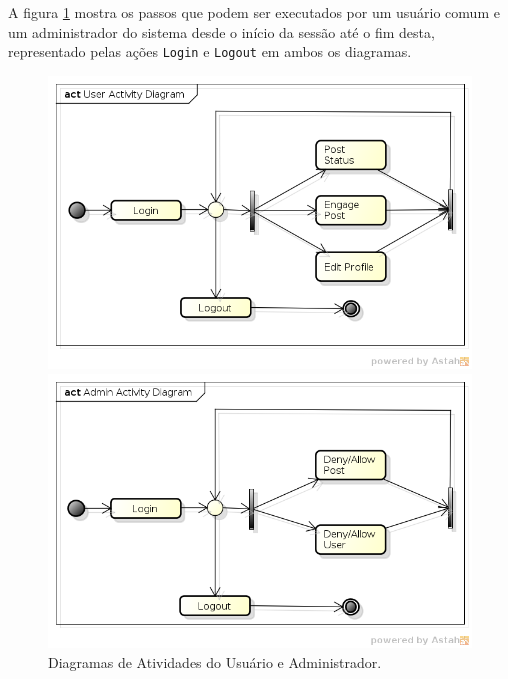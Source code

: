 \documentclass[12pt]{article}
\begin{document}
A figura \ref{fig:activity} mostra os passos que podem ser executados por um usuário comum e um administrador do sistema desde o início da sessão até o fim desta, representado pelas ações \texttt{Login} e \texttt{Logout} em ambos os diagramas.

\begin{figure}[ht]
    \begin{minipage}{.5\textwidth}
        \includegraphics[width=1\textwidth]{assets/img/user-activity-diagram.png}
    \end{minipage}
    \begin{minipage}{.5\textwidth}
        \includegraphics[width=1.1\textwidth]{assets/img/admin-activity-diagram.png}
    \end{minipage}
\label{fig:activity}
\caption{Diagramas de Atividades do Usuário e Administrador.}
\end{figure}
\end{document}
